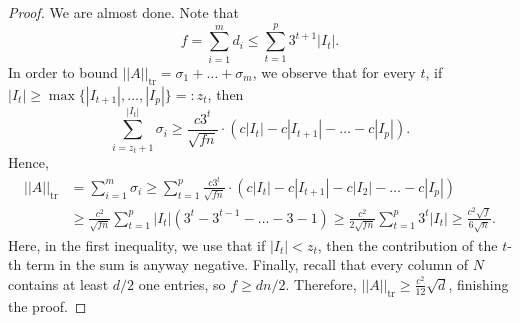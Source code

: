 \documentclass[10pt,a4paper]{amsart}
\DeclareMathOperator{\tr}{tr}
\begin{document}
\begin{proof}
We are almost done. Note that 
$$f=\sum_{i=1}^md_i\leq \sum_{t=1}^p 3^{t+1}|I_t|.$$
In order to bound $||A||_{\tr}=\sigma_1+\dots+\sigma_m$, we observe that for every $t$, if $|I_t|\geq \max\{|I_{t+1}|,\dots,|I_p|\}=:z_t$, then $$\sum_{i=z_t+1}^{|I_t|}\sigma_i\geq \frac{c3^t}{\sqrt{fn}}\cdot (c|I_t|-c|I_{t+1}|-\dots-c|I_p|).$$ Hence, 
\begin{align*}
||A||_{\tr}&=\sum_{i=1}^m \sigma_i\geq \sum_{t=1}^p \frac{c3^t}{\sqrt{fn}}\cdot (c|I_t|-c|I_{t+1}|-c|I_2|-\dots-c|I_{p}|)\\
&\geq \frac{c^2}{\sqrt{fn}}\sum_{t=1}^p |I_t|(3^t-3^{t-1}-\dots-3-1) \geq \frac{c^2}{2\sqrt{fn}}\sum_{t=1}^p3^t |I_t|\geq \frac{c^2\sqrt{f}}{6\sqrt{n}}.
\end{align*}
Here, in the first inequality, we use that if $|I_t|< z_t$, then the contribution of the $t$-th term in the sum is anyway negative. Finally, recall that every column of $N$ contains at least $d/2$ one entries, so $f\geq dn/2$. Therefore, $||A||_{\tr}\geq \frac{c^2}{12}\sqrt{d}$, finishing the proof.
\end{proof}
\end{document}
